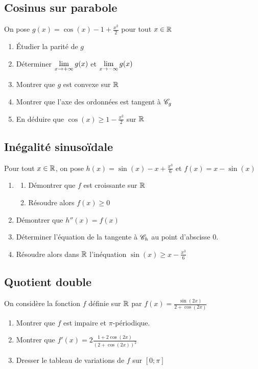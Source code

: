 \documentclass[oneside,12pt]{book}          %
\begin{document}
\subsection{Cosinus sur parabole}
On pose $g(x)=\cos(x)-1+\frac{x^2}{2}$ pour tout ${x\in\mathbb R}$
\begin{enumerate}
	\item Étudier la parité de $g$
	\item Déterminer ${\lim\limits_{x\to +\infty}}\, g(x)$ et ${\lim\limits_{\substack{x\to-\infty}}}\,g(x)$
	\item Montrer que $g$ est convexe sur ${\mathbb R}$
	\item Montrer que l'axe des ordonnées est tangent à ${\mathscr{C}}_g$
	\item En déduire que $\cos(x)\geq1-\frac{x^2}{2}$ sur ${\mathbb R}$
\end{enumerate}



\subsection{Inégalité sinusoïdale}
Pour tout ${x\in\mathbb R}$, on pose $h(x)=\sin(x)-x+\frac{x^3}{6}$ et $f(x)=x-\sin(x)$
\begin{enumerate}
	\item \begin{enumerate}
		\item Démontrer que $f$ est croissante sur ${\mathbb R}$
		\item Résoudre alors $f(x)\geq0$
	\end{enumerate}
	\item Démontrer que $h''(x)=f(x)$
	\item Déterminer l'équation de la tangente à ${\mathscr{C}}_h$ au point d'abscisse 0.
	\item Résoudre alors dans ${\mathbb R}$ l'inéquation $\sin(x)\geq x-\frac{x^3}{6}$
\end{enumerate} 



\subsection{Quotient double}
On considère la fonction $f$ définie sur ${\mathbb R}$ par $f(x)=\frac{\sin(2x)}{2+\cos(2x)}$
\begin{enumerate}
	\item Montrer que $f$ est impaire et $\pi$-périodique.
	\item Montrer que $f'(x)=2\frac{1+2\cos(2x)}{(2+\cos(2x))^2}$
	\item Dresser le tableau de variations de $f$ sur $[0;\pi]$
\end{enumerate}
\end{document}
